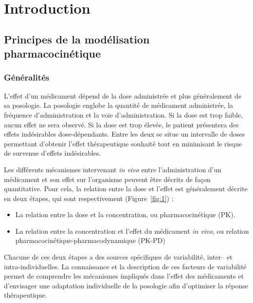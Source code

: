 \chapter{Introduction}
\section{Principes de la modélisation pharmacocinétique}
\subsection{Généralités}
L'effet d'un médicament dépend de la dose administrée et plus généralement de sa posologie. La posologie englobe la quantité de médicament administrée, la fréquence d'administration et la voie d'administration. Si la dose est trop faible, aucun effet ne sera observé. Si la dose est trop élevée, le patient présentera des effets indésirables dose-dépendants. Entre les deux se situe un intervalle de doses permettant d'obtenir l'effet thérapeutique souhaité tout en minimisant le risque de survenue d'effets indésirables.

Les différents mécanismes intervenant \textit{in vivo} entre l'administration d'un médicament et son effet sur l'organisme peuvent être décrits de façon quantitative. Pour cela, la relation entre la dose et l'effet est généralement décrite en deux étapes, qui sont respectivement (Figure~\ref{fig:1}) :
\begin{itemize}
\item La relation entre la dose et la concentration, ou pharmacocinétique (PK).
\item La relation entre la concentration et l'effet du médicament \textit{in vivo}, ou relation pharmacocinétique-pharmacodynamique (PK-PD)
\end{itemize}

Chacune de ces deux étapes a des sources spécifiques de variabilité, inter-- et intra-individuelles. La connaissance et la description de ces facteurs de variabilité permet de comprendre les mécanismes impliqués dans l'effet des médicaments et d'envisager une adaptation individuelle de la posologie afin d'optimiser la réponse thérapeutique.

